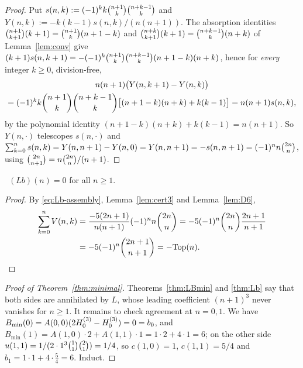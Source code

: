 \begin{proof}
Put $s(n,k):=(-1)^kk\binom{n+1}{k}\binom{n+k-1}{k}$ and $Y(n,k):=-k(k-1)s(n,k)/(n(n+1))$. The
absorption identities $\binom{n+1}{k+1}(k+1)=\binom{n+1}{k}(n+1-k)$ and
$\binom{n+k}{k+1}(k+1)=\binom{n+k-1}{k}(n+k)$ of Lemma~\ref{lem:conv} give
$(k+1)s(n,k+1)=-(-1)^k\binom{n+1}{k}\binom{n+k-1}{k}(n+1-k)(n+k)$, hence for \emph{every} integer
$k\ge0$, division-free,
\begin{multline*}
   n(n+1)\bigl(Y(n,k+1)-Y(n,k)\bigr)\\
   =(-1)^kk\binom{n+1}{k}\binom{n+k-1}{k}\bigl[(n+1-k)(n+k)+k(k-1)\bigr]=n(n+1)s(n,k),
\end{multline*}
by the polynomial identity $(n+1-k)(n+k)+k(k-1)=n(n+1)$. So $Y(n,\cdot)$ telescopes
$s(n,\cdot)$ and $\sum_{k=0}^ns(n,k)=Y(n,n+1)-Y(n,0)=Y(n,n+1)=-s(n,n+1)
=(-1)^nn\binom{2n}{n}$, using $\binom{2n}{n+1}=n\binom{2n}{n}/(n+1)$.
\end{proof}

\begin{theorem}\label{thm:Lb}
\Proved\ $(Lb)(n)=0$ for all $n\ge1$.
\end{theorem}

\begin{proof}
By \eqref{eq:Lb-assembly}, Lemma~\ref{lem:cert3} and Lemma~\ref{lem:D6},
\begin{align*}
   \sum_{k=0}^{n}V(n,k)
   &=\frac{-5(2n+1)}{n(n+1)}(-1)^nn\binom{2n}{n}
    =-5(-1)^n\binom{2n}{n}\frac{2n+1}{n+1}\\
   &=-5(-1)^n\binom{2n+1}{n+1}=-\mathrm{Top}(n). \qedhere
\end{align*}
\end{proof}

\begin{proof}[Proof of Theorem~\ref{thm:minimal}]
Theorems~\ref{thm:LBmin} and \ref{thm:Lb} say that both sides are annihilated by $L$,
whose leading coefficient $(n+1)^3$ never vanishes for $n\ge1$. It remains to check
agreement at $n=0,1$. We have $B_{\min}(0)=A(0,0)(2H^{(3)}_{0}-H^{(3)}_{0})=0=b_0$, and
$B_{\min}(1)=A(1,0)\cdot2+A(1,1)\cdot1=1\cdot2+4\cdot1=6$; on the other side
$u(1,1)=1/(2\cdot1^3\binom{1}{1}\binom{2}{1})=1/4$, so $c(1,0)=1$, $c(1,1)=5/4$ and
$b_1=1\cdot1+4\cdot\tfrac54=6$. Induct.
\end{proof}

